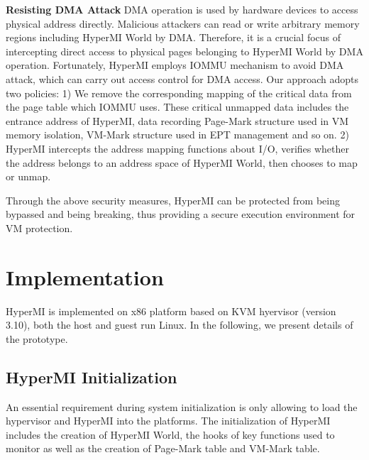 \documentclass[conference]{IEEEtran}
\begin{document}
\textbf{Resisting DMA Attack}
DMA operation is used by hardware devices to access physical address directly. Malicious attackers can read or write arbitrary memory regions including HyperMI World by DMA. Therefore, it is a crucial focus of intercepting direct access to physical pages belonging to HyperMI World by DMA operation. 
Fortunately, HyperMI employs IOMMU mechanism to avoid DMA attack, which can carry out access control for DMA access. Our approach adopts two policies: 1) We remove the corresponding mapping of the critical data from the page table which IOMMU uses. These critical unmapped data includes the entrance address of HyperMI, data recording Page-Mark structure used in VM memory isolation, VM-Mark structure used in EPT management and so on. 2) HyperMI intercepts the address mapping functions about I/O, verifies whether the address belongs to an address space of HyperMI World, then chooses to map or unmap.


Through the above security measures, HyperMI can be protected from being bypassed and being breaking, thus providing a secure execution environment for VM protection.




















\iffalse
\section{Implementation}\label{sec:imp}

HyperMI is implemented on x86 platform based on KVM hyervisor (version 3.10), both the host and guest run Linux. In the following, we present details of the prototype. 

\subsection {HyperMI Initialization}
An essential requirement during system initialization is only allowing to load the hypervisor and HyperMI into the platforms.
The initialization of HyperMI includes the creation of HyperMI World, the hooks of key functions used to monitor as well as the creation of Page-Mark table and VM-Mark table. 
\end{document}
